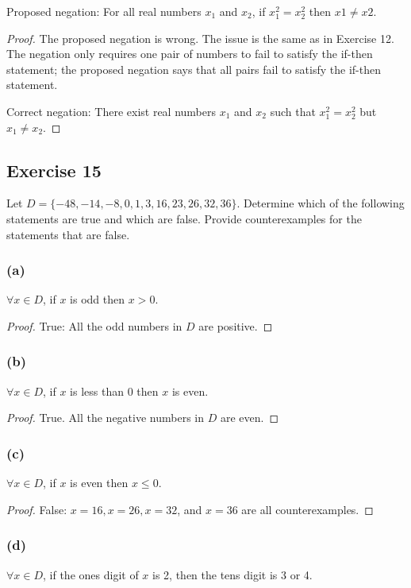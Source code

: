 \documentclass[14pt]{extarticle}
\newcommand{\fa}{\forall}
\begin{document}
Proposed negation: For all real numbers $x_1$ and $x_2$, if $x_1^2 = x_2^2$ then $x1 \neq x2$.

\begin{proof}
The proposed negation is wrong. The issue is the same as in Exercise 12. The negation only requires one pair of numbers to fail to satisfy the if-then statement; the proposed negation says that all pairs fail to satisfy the if-then statement.

Correct negation: There exist real numbers $x_1$ and $x_2$ such that $x_1^2 = x_2^2$ but $x_1 \neq x_2$.
\end{proof}

\subsection{Exercise 15}
Let $D = \{-48, -14, -8, 0, 1, 3, 16, 23, 26, 32, 36\}$.
Determine which of the following statements are true and which are false. Provide counterexamples for the statements that are false.

\subsubsection{(a)}
$\fa x \in D$, if $x$ is odd then $x > 0$.

\begin{proof}
True: All the odd numbers in $D$ are positive.
\end{proof}

\subsubsection{(b)}
$\fa x \in D$, if $x$ is less than 0 then $x$ is even.

\begin{proof}
True. All the negative numbers in $D$ are even.
\end{proof}

\subsubsection{(c)}
$\fa x \in D$, if $x$ is even then $x \leq 0$.

\begin{proof}
False: $x = 16, x = 26, x = 32$, and $x = 36$ are all
counterexamples.
\end{proof}

\subsubsection{(d)}
$\fa x \in D$, if the ones digit of $x$ is 2, then the tens digit is 3 or 4.
\end{document}
